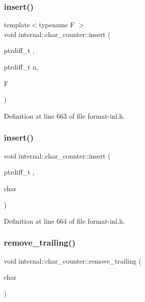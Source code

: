 \subsubsection{\texorpdfstring{insert()}{insert()}\hspace{0.1cm}{\footnotesize\ttfamily [1/2]}}
{\footnotesize\ttfamily template$<$typename F $>$ \\
void internal\+::char\+\_\+counter\+::insert (\begin{DoxyParamCaption}\item[{ptrdiff\+\_\+t}]{,  }\item[{ptrdiff\+\_\+t}]{n,  }\item[{F}]{ }\end{DoxyParamCaption})\hspace{0.3cm}{\ttfamily [inline]}}



Definition at line 663 of file format-\/inl.\+h.

\mbox{\label{structinternal_1_1char__counter_aa18c987a332b69675c1f3f1b40b2fd22}} 
\subsubsection{\texorpdfstring{insert()}{insert()}\hspace{0.1cm}{\footnotesize\ttfamily [2/2]}}
{\footnotesize\ttfamily void internal\+::char\+\_\+counter\+::insert (\begin{DoxyParamCaption}\item[{ptrdiff\+\_\+t}]{,  }\item[{char}]{ }\end{DoxyParamCaption})\hspace{0.3cm}{\ttfamily [inline]}}



Definition at line 664 of file format-\/inl.\+h.

\mbox{\label{structinternal_1_1char__counter_a483041fe499e14818b5f4e5062af0dce}} 
\subsubsection{\texorpdfstring{remove\+\_\+trailing()}{remove\_trailing()}}
{\footnotesize\ttfamily void internal\+::char\+\_\+counter\+::remove\+\_\+trailing (\begin{DoxyParamCaption}\item[{char}]{ }\end{DoxyParamCaption})\hspace{0.3cm}{\ttfamily [inline]}}




